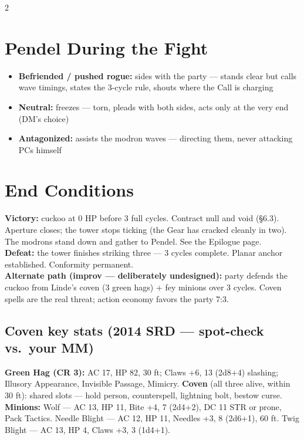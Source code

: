 \documentclass[10pt,letterpaper]{article}
\begin{document}
\begin{multicols}{2}
\section*{Pendel During the Fight}
\begin{itemize}
\item \textbf{Befriended / pushed rogue:} sides with the party --- stands clear but calls wave timings, states the 3-cycle rule, shouts where the Call is charging
\item \textbf{Neutral:} freezes --- torn, pleads with both sides, acts only at the very end (DM's choice)
\item \textbf{Antagonized:} assists the modron waves --- directing them, never attacking PCs himself
\end{itemize}

\section*{End Conditions}
\textbf{Victory:} cuckoo at 0 HP before 3 full cycles. Contract null and void (\S6.3). Aperture closes; the tower stops ticking (the Gear has cracked cleanly in two). The modrons stand down and gather to Pendel. See the Epilogue page.\\
\textbf{Defeat:} the tower finishes striking three --- 3 cycles complete. Planar anchor established. Conformity permanent.\\
\textbf{Alternate path (improv --- deliberately undesigned):} party defends the cuckoo from Linde's coven (3 green hags) + fey minions over 3 cycles. Coven spells are the real threat; action economy favors the party 7:3.

\subsection*{Coven key stats (2014 SRD --- spot-check vs.\ your MM)}
\textbf{Green Hag (CR 3):} AC 17, HP 82, 30 ft; Claws +6, 13 (2d8+4) slashing; Illusory Appearance, Invisible Passage, Mimicry. \textbf{Coven} (all three alive, within 30 ft): shared slots --- hold person, counterspell, lightning bolt, bestow curse.\\
\textbf{Minions:} Wolf --- AC 13, HP 11, Bite +4, 7 (2d4+2), DC 11 STR or prone, Pack Tactics. Needle Blight --- AC 12, HP 11, Needles +3, 8 (2d6+1), 60 ft. Twig Blight --- AC 13, HP 4, Claws +3, 3 (1d4+1).


\end{multicols}
\end{document}
